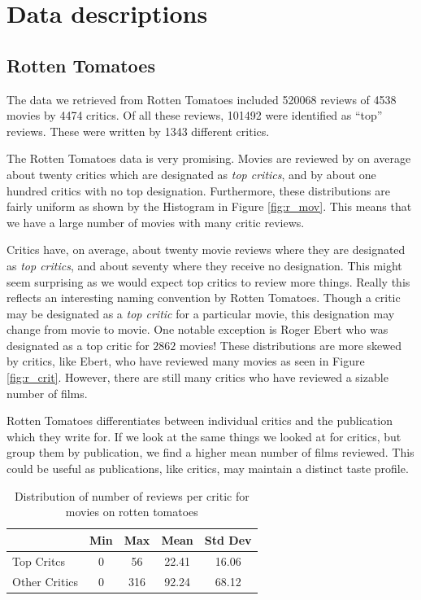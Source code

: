 \documentclass[12pt]{article}
\begin{document}
\section{Data descriptions}

\subsection{Rotten Tomatoes}

	The data we retrieved from Rotten Tomatoes included 520068 reviews of 4538 movies by 4474 critics. Of all these reviews, 101492 were identified as ``top'' reviews. These were written by 1343 different critics.

	The Rotten Tomatoes data is very promising. Movies are reviewed by on average about twenty critics which are designated as \textit{top critics}, and by about one hundred critics with no top designation. Furthermore, these distributions are fairly uniform as shown by the Histogram in Figure \ref{fig:r_mov}. This means that we have a large number of movies with many critic reviews.

	Critics have, on average, about twenty movie reviews where they are designated as \textit{top critics}, and about seventy where they receive no designation. This might seem surprising as we would expect top critics to review more things. Really this reflects an interesting naming convention by Rotten Tomatoes. Though a critic may be designated as a \textit{top critic} for a particular movie, this designation may change from movie to movie. One notable exception is Roger Ebert who was designated as a top critic for $2862$ movies! These distributions are more skewed by critics, like Ebert, who have reviewed many movies as seen in Figure \ref{fig:r_crit}. However, there are still many critics who have reviewed a sizable number of films.

	Rotten Tomatoes differentiates between individual critics and the publication which they write for. If we look at the same things we looked at for critics, but group them by publication, we find a higher mean number of films reviewed. This could be useful as publications, like critics, may maintain a distinct taste profile.

	\begin{table}[H]
	 \centering
	 \caption{Distribution of number of reviews per critic for movies on rotten tomatoes}
	 \begin{tabular}{ l | c | c | c | c }
	 \hline
	 &  Min & Max & Mean & Std Dev  \\
	 \hline
	 Top Critcs & 0 & 56 & 22.41 & 16.06 \\
	 Other Critics & 0 & 316 & 92.24 & 68.12 \\
	 \hline
	 \end{tabular}
	 \end{table}
\end{document}
